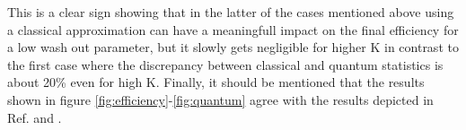 This is a clear sign showing that in the latter of the cases mentioned above using a classical approximation can have a meaningfull impact on the final efficiency for a low wash out parameter, but it slowly gets negligible for higher K in contrast to the first case where the discrepancy between classical and quantum statistics is about 20\% even for high K.\newline\indent
Finally, it should be mentioned that the results shown in figure \ref{fig:efficiency}-\ref{fig:quantum} agree with the results depicted in Ref. \cite{Bodeker:2013qaa} and \cite{Wormann:2016yyi}.\newpage
